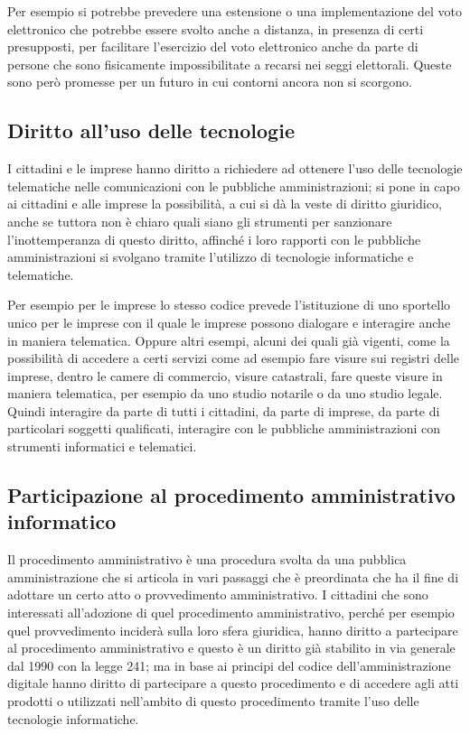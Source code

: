 Per esempio si potrebbe prevedere una estensione o una implementazione del voto elettronico che potrebbe essere svolto anche a distanza, in presenza di certi presupposti, per facilitare l'esercizio del voto elettronico anche da parte di persone che sono fisicamente impossibilitate a recarsi nei seggi elettorali.
Queste sono però promesse per un futuro in cui contorni ancora non si scorgono. 

\subsection{Diritto all'uso delle tecnologie}
I cittadini e le imprese hanno diritto a richiedere ad ottenere l'uso delle tecnologie telematiche nelle comunicazioni con le pubbliche amministrazioni; si pone in capo ai cittadini e alle imprese la possibilità, a cui si dà la veste di diritto giuridico, anche se tuttora non è chiaro quali siano gli strumenti per sanzionare l'inottemperanza di questo diritto, affinché i loro rapporti con le pubbliche amministrazioni si svolgano tramite l'utilizzo di tecnologie informatiche e telematiche. 

Per esempio per le imprese lo stesso codice prevede l'istituzione di uno sportello unico per le imprese con il quale le imprese possono dialogare e interagire anche in maniera telematica. Oppure altri esempi, alcuni dei quali già vigenti, come la possibilità di accedere a certi servizi come ad esempio fare visure sui registri delle imprese, dentro le camere di commercio, visure catastrali, fare queste visure in maniera telematica, per esempio da uno studio notarile o da uno studio legale. Quindi interagire da parte di tutti i cittadini, da parte di imprese, da parte di particolari soggetti qualificati, interagire con le pubbliche amministrazioni con strumenti informatici e telematici. 

\subsection{Participazione al procedimento amministrativo informatico}
Il procedimento amministrativo è una procedura svolta da una pubblica amministrazione che si articola in vari passaggi che è preordinata che ha il fine di adottare un certo atto o provvedimento amministrativo. I cittadini che sono interessati all'adozione di quel procedimento amministrativo, perché per esempio quel provvedimento inciderà sulla loro sfera giuridica, hanno diritto a partecipare al procedimento amministrativo e questo è un diritto già stabilito in via generale dal 1990 con la legge 241; ma in base ai principi del codice dell'amministrazione digitale hanno diritto di partecipare a questo procedimento e di accedere agli atti prodotti o utilizzati nell'ambito di questo procedimento tramite l'uso delle tecnologie informatiche. 

